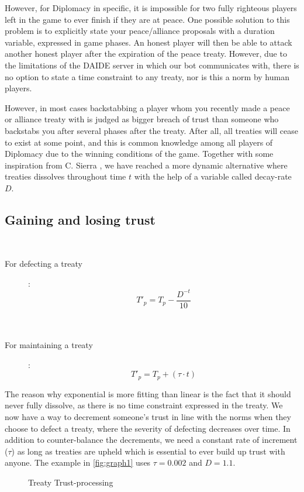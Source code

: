 \documentclass[a4paper]{article} %
\begin{document}
However, for Diplomacy in specific, it is impossible for two fully righteous players left in the game to ever finish if they are at peace. One possible solution to this problem is to explicitly state your peace/alliance proposals with a duration variable, expressed in game phases. An honest player will then be able to attack another honest player after the expiration of the peace treaty. However, due to the limitations of the DAIDE server in which our bot communicates with, there is no option to state a time constraint to any treaty, nor is this a norm by human players.

However, in most cases backstabbing a player whom you recently made a peace or alliance treaty with is judged as bigger breach of trust than someone who backstabs you after several phases after the treaty. After all, all treaties will cease to exist at some point, and this is common knowledge among all players of Diplomacy due to the winning conditions of the game. Together with some inspiration from C. Sierra \cite{trust}, we have reached a more dynamic alternative where treaties dissolves throughout time $t$ with the help of a variable called decay-rate $D$.

\subsection{Gaining and losing trust}
\
\begin{description}
\item[For defecting a treaty]: 
$$T'_p = T_p - \frac{D^{-t}} {10}$$ \\
\
\item[For maintaining a treaty]: 
$$T'_p = T_p + (\tau \cdot t)$$
\end{description}

The reason why exponential is more fitting than linear is the fact that it should never fully dissolve, as there is no time constraint expressed in the treaty. We now have a way to decrement someone's trust in line with the norms when they choose to defect a treaty, where the severity of defecting decreases over time. In addition to counter-balance the decrements, we need a constant rate of increment ($\tau$) as long as treaties are upheld which is essential to ever build up trust with anyone. The example in \autoref{fig:graph1} uses $\tau = 0.002$ and $D = 1.1$.

\begin{figure}[H]
\centering
{}
\caption{Treaty Trust-processing}
\label{fig:graph1}
\end{figure}
\end{document}
